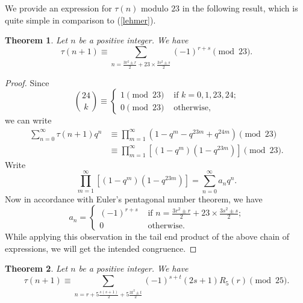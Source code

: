 \documentclass[10pt]{article}
\newtheorem{theorem}{Theorem}[section]
\theoremstyle{definition}
\begin{document}
We provide an expression for $\tau(n)$ modulo $23$ in the following result, which is quite simple in comparison to (\ref{lehmer}).
\begin{theorem}
Let $n$ be a positive integer. We have
\begin{equation}
\tau(n+1)\equiv\sum_{n=\frac{3r^2\pm r}{2}+23\times\frac{3s^2\pm s}{2}}(-1)^{r+s}\pmod{23}.
\end{equation}
\end{theorem}
\begin{proof}
Since 
\[{24\choose{k}}\equiv\begin{cases}
1\pmod{23}&\text{ if $k=0, 1, 23, 24$;}\\
0\pmod{23}&\text{ otherwise,}
\end{cases}
\]
we can write
\begin{align*}
\sum_{n=0}^{\infty}\tau(n+1)q^n
&\equiv\prod_{m=1}^{\infty}\left(1-q^m-q^{23m}+q^{24m}\right)\pmod{23}\\
&\equiv\prod_{m=1}^{\infty}\left[(1-q^m)(1-q^{23m})\right]\pmod{23}.
\end{align*}
Write 
\[\prod_{m=1}^{\infty}\left[(1-q^m)(1-q^{23m})\right]=\sum_{n=0}^{\infty}a_nq^n.
\]
Now in accordance with Euler's pentagonal number theorem, we have
\[a_n=\begin{cases}
(-1)^{r+s}&\text{ if $n=\frac{3r^2\pm r}{2}+23\times\frac{3s^2\pm s}{2}$;}\\
0&\text{ otherwise.}
\end{cases}
\]
While applying this observation in the tail end product of the above chain of expressions, we will get the intended congruence.
\end{proof}
\begin{theorem}
Let $n$ be a positive integer. We have
\begin{equation}
\tau(n+1)\equiv \sum_{n=r+5\frac{s(s+1)}{2}+5\frac{3t^2\pm t}{2}}(-1)^{s+t}(2s+1)R_{5}(r)\pmod{25}.
\end{equation}
\end{theorem}
\end{document}
